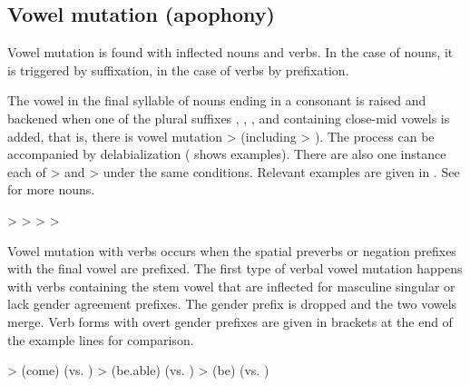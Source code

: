 \subsection{Vowel mutation (apophony)}
\label{ssec:Vowel mutation (apophony)}

Vowel mutation is found with inflected nouns and verbs. In the case of nouns, it is triggered by suffixation, in the case of verbs by prefixation.

The vowel  in the final syllable of nouns ending in a consonant is raised and backened when one of the plural suffixes , , , and  containing close-mid vowels is added, that is, there is vowel mutation  >  (including  > ). The process can be accompanied by delabialization ( shows examples). There are also one instance each of  >  and  >  under the same conditions. Relevant examples are given in . See  for more nouns.
%
\begin{exe}
	\label{ex:a u e u e i phon}
	\begin{xlist}
		\ex	{} >  
		\ex	{} >  
		\ex	{} >  
		\ex	{} >  
	\end{xlist}
\end{exe}

Vowel mutation with verbs occurs when the spatial preverbs or negation prefixes with the final vowel  are prefixed. The first type of verbal vowel mutation happens with verbs containing the stem vowel  that are inflected for masculine singular or lack gender agreement prefixes. The gender prefix is dropped and the two vowels merge. Verb forms with overt gender prefixes are given in brackets at the end of the example lines for comparison.
%
\begin{exe}
	\label{ex:a i e phon}
	\begin{xlist}
		\ex	{} >   (come) (vs. \tit{sa-b-irʁ-an}) 
		\ex	{} >   (be.able) (vs. \tit{a-b-irχʷ-ar})
		\ex	{} >   (be) (vs. \tit{ka-r-irg-an=da})
	\end{xlist}
\end{exe}

